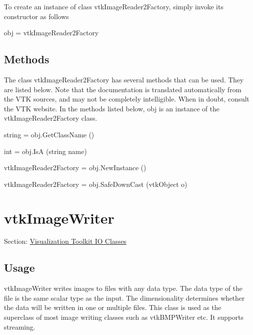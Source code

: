 To create an instance of class vtk\-Image\-Reader2\-Factory, simply invoke its constructor as follows \begin{DoxyVerb}  obj = vtkImageReader2Factory
\end{DoxyVerb}
 \hypertarget{vtkwidgets_vtkxyplotwidget_Methods}{}\subsection{Methods}\label{vtkwidgets_vtkxyplotwidget_Methods}
The class vtk\-Image\-Reader2\-Factory has several methods that can be used. They are listed below. Note that the documentation is translated automatically from the V\-T\-K sources, and may not be completely intelligible. When in doubt, consult the V\-T\-K website. In the methods listed below, {\ttfamily obj} is an instance of the vtk\-Image\-Reader2\-Factory class. 
\begin{DoxyItemize}
\item {\ttfamily string = obj.\-Get\-Class\-Name ()}  
\item {\ttfamily int = obj.\-Is\-A (string name)}  
\item {\ttfamily vtk\-Image\-Reader2\-Factory = obj.\-New\-Instance ()}  
\item {\ttfamily vtk\-Image\-Reader2\-Factory = obj.\-Safe\-Down\-Cast (vtk\-Object o)}  
\end{DoxyItemize}\hypertarget{vtkio_vtkimagewriter}{}\section{vtk\-Image\-Writer}\label{vtkio_vtkimagewriter}
Section\-: \hyperlink{sec_vtkio}{Visualization Toolkit I\-O Classes} \hypertarget{vtkwidgets_vtkxyplotwidget_Usage}{}\subsection{Usage}\label{vtkwidgets_vtkxyplotwidget_Usage}
vtk\-Image\-Writer writes images to files with any data type. The data type of the file is the same scalar type as the input. The dimensionality determines whether the data will be written in one or multiple files. This class is used as the superclass of most image writing classes such as vtk\-B\-M\-P\-Writer etc. It supports streaming.

